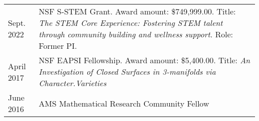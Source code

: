 \documentclass[12pt]{article}
\begin{document}
\begin{tabular}{ l p{15in} }

Sept. 2022 & NSF S-STEM Grant. Award amount: \$749,999.00.
			\newline Title: \textit{The STEM Core Experience: Fostering STEM talent through community
				\newline building and wellness support}. Role: Former PI. \\
April 2017 & NSF EAPSI Fellowship. Award amount: \$5,400.00. 
			\newline Title: \textit{An Investigation of Closed Surfaces in 3-manifolds via Character.Varieties} \\
June 2016 & AMS Mathematical Research Community Fellow 

\end{tabular}

%
%
%
\end{document}
